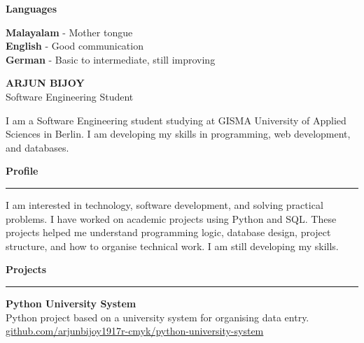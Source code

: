 \documentclass[10pt,a4paper]{article}
\begin{document}
{\begin {minipage}[t][27.5cm][t]{0.30\textwidth}
\begin{minipage}{0.78\textwidth}
\vspace{0.4cm}

{\large \textbf{Languages}}

\vspace{0.2cm}

\textbf{Malayalam} - Mother tongue\\
\textbf{English} - Good communication\\
\textbf{German} - Basic to intermediate, still improving

\end{minipage}
\end{minipage}
}
\hfill
\begin{minipage}[t][27.5cm][t]{0.66\textwidth}

\vspace{1.4cm}

\colorbox{soft}{
\begin{minipage}{0.96\textwidth}
\vspace{0.7cm}
{\Huge \textbf{ARJUN BIJOY}}\\
{\Large \textcolor{accent}{Software Engineering Student}}
\vspace{0.7cm}
\end {minipage}
}

\vspace{0.6cm}

I am a Software Engineering student studying at GISMA University of Applied Sciences in Berlin. I am developing my skills in programming, web development, and databases.

\vspace {0.3cm}

{\Large \textbf{Profile}}\\[-0.1cm]
\textcolor{accent}{\rule{1.5cm}{1pt}}

\vspace{0.2cm}

I am interested in technology, software development, and solving practical problems. I have worked on academic projects using Python and SQL. These projects helped me understand programming logic, database design, project structure, and how to organise technical work. I am still developing my skills.

\vspace{0.3cm}

{\Large \textbf{Projects}}\\[-0.1cm]
\textcolor{accent}{\rule{1.5cm}{1pt}}

\vspace{0.2cm}

\textbf{Python University System}\\
Python project based on a university system for organising data entry.\\
\href{https://github.com/arjunbijoy1917r-cmyk/python-university-system}{github.com/arjunbijoy1917r-cmyk/python-university-system}


\end{minipage}
\end{document}
